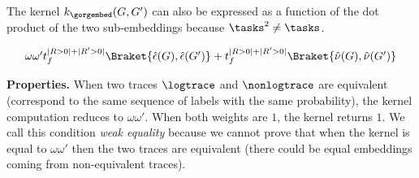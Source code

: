 %		
%
%
The kernel $k_{\gorgembed}(G,G')$ can also be expressed as a function of the dot product of the two sub-embeddings because $\tasks^2\neq\tasks$.

\vspace*{-3mm}
\begin{equation}\label{eq:corollLem1}
\begin{array}{l}\omega\omega't_f^{|R>0|+|R'>0|}\Braket{\hat{\epsilon}(G), \hat{\epsilon}(G')}+t_f^{|R>0|+|R'>0|}\Braket{\hat{\nu}(G), \hat{\nu}(G')}
\end{array}  
\end{equation}

\noindent
\textbf{Properties.}\label{subsub:prop}
When two traces $\logtrace$ and ${\nonlogtrace}$ are equivalent (correspond to the same sequence of labels with the 
same probability), the kernel computation reduces to $\omega\omega'$. When both weights are $1$, the kernel returns $1$. 
We call this condition \textit{weak equality} because we cannot prove that when the kernel is equal to $\omega\omega'$ then the two traces are equivalent (there could be equal embeddings coming from non-equivalent traces). 

